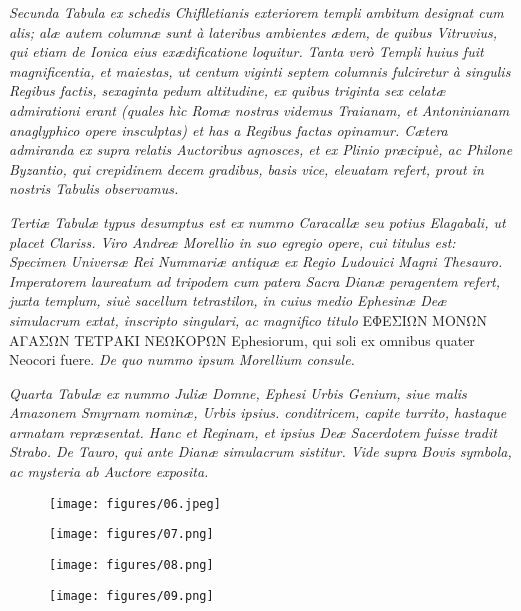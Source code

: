 \documentclass[a4paper, 11pt, oneside, polutonikogreek, latin]{article}
\begin{document}
\emph{Secunda Tabula ex schedis Chiflletianis exteriorem templi ambitum designat cum alis; alæ autem columnæ sunt à lateribus ambientes ædem, de quibus Vitruvius, qui etiam de Ionica eius exædificatione loquitur. Tanta verò Templi huius fuit magnificentia, et maiestas, ut centum viginti septem columnis fulciretur à singulis Regibus factis, sexaginta pedum altitudine, ex quibus triginta sex celatæ admirationi erant (quales hìc Romæ nostras videmus Traianam, et Antoninianam anaglyphico opere insculptas) et has a Regibus factas opinamur. Cætera admiranda ex supra relatis Auctoribus agnosces, et ex Plinio præcipuè, ac Philone Byzantio, qui crepidinem decem gradibus, basis vice, eleuatam refert, prout in nostris Tabulis observamus.}

\emph{Tertiæ Tabulæ typus desumptus est ex nummo Caracallæ seu potius Elagabali, ut placet Clariss. Viro Andreæ Morellio in suo egregio opere, cui titulus est: Specimen Universæ Rei Nummariæ antiquæ ex Regio Ludouici Magni Thesauro. Imperatorem laureatum ad tripodem cum patera Sacra Dianæ peragentem refert, juxta templum, siuè sacellum tetrastilon, in cuius medio Ephesinæ Deæ simulacrum extat, inscripto singulari, ac magnifico titulo} \foreignlanguage{greek}{ΕΦΕΣΙΩΝ ΜΟΝΩΝ ΑΓΑΣΩΝ ΤΕΤΡΑΚΙ ΝΕΩΚΟΡΩΝ} Ephesiorum, qui soli ex omnibus quater Neocori fuere. \emph{De quo nummo ipsum Morellium consule.}

\emph{Quarta Tabulæ ex nummo Juliæ Domne, Ephesi Urbis Genium, siue malis Amazonem Smyrnam nominæ, Urbis ipsius. conditricem, capite turrito, hastaque armatam repræsentat. Hanc et Reginam, et ipsius Deæ Sacerdotem fuisse tradit Strabo. De Tauro, qui ante Dianæ simulacrum sistitur. Vide supra Bovis symbola, ac mysteria ab Auctore exposita.}
\clearpage
\vspace*{\fill}
\begin{figure}[H]
\centering
\texttt{[image: figures/06.jpeg]}
\end{figure}
\vspace*{\fill}
\clearpage
\vspace*{\fill}
\begin{figure}[H]
\centering
\texttt{[image: figures/07.png]}
\end{figure}
\vspace*{\fill}
\clearpage
\vspace*{\fill}
\begin{figure}[H]
\centering
\texttt{[image: figures/08.png]}
\end{figure}
\vspace*{\fill}
\clearpage
\vspace*{\fill}
\begin{figure}[H]
\centering
\texttt{[image: figures/09.png]}
\end{figure}
\vspace*{\fill}
\clearpage
\end{document}
